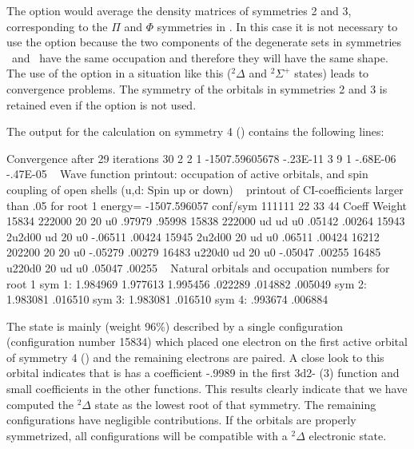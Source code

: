 
The  option would average the density matrices of symmetries 2 and 3,
corresponding to the $\Pi$ and $\Phi$ symmetries in \Cinfv. In this case
it is not necessary to use the option because the two components of the 
degenerate sets in symmetries \bo\ and \bt\ have the same occupation and
therefore they will have the same shape. The use of the option in a situation
like this ($^2\Delta$ and $^2\Sigma^+$ states) leads to convergence problems.
The symmetry of the orbitals in symmetries 2 and 3 is retained even if the 
 option is not used.

The output for the calculation on symmetry 4 (\at) contains the following lines:

\begin{sourcelisting}
      Convergence after  29 iterations
       30   2    2    1 -1507.59605678    -.23E-11   3   9 1  -.68E-06  -.47E-05  
~
                                  Wave function printout:
occupation of active orbitals, and spin coupling of open shells (u,d: Spin up or down)
~
      printout of CI-coefficients larger than   .05 for root   1
      energy=  -1507.596057
      conf/sym  111111 22 33 44     Coeff  Weight
         15834  222000 20 20 u0    .97979  .95998
         15838  222000 ud ud u0    .05142  .00264
         15943  2u2d00 ud 20 u0   -.06511  .00424
         15945  2u2d00 20 ud u0    .06511  .00424
         16212  202200 20 20 u0   -.05279  .00279
         16483  u220d0 ud 20 u0   -.05047  .00255
         16485  u220d0 20 ud u0    .05047  .00255
~
      Natural orbitals and occupation numbers for root  1
      sym 1:   1.984969   1.977613   1.995456    .022289    .014882    .005049
      sym 2:   1.983081    .016510
      sym 3:   1.983081    .016510
      sym 4:    .993674    .006884
\end{sourcelisting}


The state is mainly (weight 96\%) described by a single configuration 
(configuration number 15834) which placed one electron on the first active
orbital of symmetry 4 (\at) and the remaining electrons are paired. 
A close look to this orbital indicates that is
has a coefficient -.9989 in the first 3d2- (3\dxy) function and small
coefficients in the other functions. This results clearly indicate that
we have computed the $^2\Delta$ state as the lowest root of that symmetry.
The remaining configurations have negligible contributions. If the orbitals
are properly symmetrized, all configurations will be compatible with a
$^2\Delta$ electronic state.

